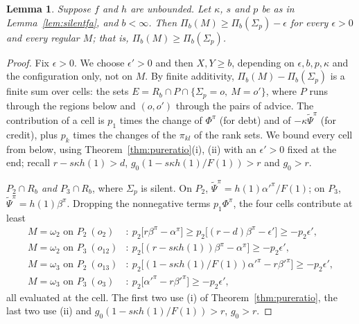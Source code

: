 \documentclass[11pt]{article}
\newtheorem{lemma}[theorem]{Lemma}
\theoremstyle{definition}\newtheorem{definition}[theorem]{Definition}
\theoremstyle{remark}\newtheorem{remark}[theorem]{Remark}
\newcommand{\Psitil}{\widetilde\Psi}
\begin{document}
\begin{lemma}\label{lem:pureopt}
Suppose $f$ and $h$ are unbounded. Let $\kappa$, $s$ and $p$ be as in
Lemma~\ref{lem:silentfa}, and $b<\infty$. Then
$\Pi_b(M)\ge\Pi_b(\Sigma_p)-\epsilon$ for every $\epsilon>0$ and every
regular $M$; that is, $\Pi_b(M)\ge\Pi_b(\Sigma_p)$.
\end{lemma}
\begin{proof}
Fix $\epsilon>0$. We choose $\epsilon'>0$ and then $X,Y\ge b$, depending
on $\epsilon,b,p,\kappa$ and the configuration only, not on $M$.
By finite additivity, $\Pi_b(M)-\Pi_b(\Sigma_p)$ is a finite sum over cells:
the sets $E=R_b\cap P\cap\{\Sigma_p=o,\ M=o'\}$, where $P$ runs through the
regions below and $(o,o')$ through the pairs of advice. The contribution of
a cell is $p_1$ times the change of $\Phi^\pi$ (for debt) and of
$-\kappa\Psitil^\pi$ (for credit), plus $p_k$ times the changes of the
$\pi_{kl}$ of the rank sets. We bound every cell from below, using
Theorem~\ref{thm:pureratio}(i), (ii) with an $\epsilon'>0$ fixed at the end;
recall $r-s\kappa h(1)>d$, $g_0(1-s\kappa h(1)/F(1))>r$ and $g_0>r$.

\emph{$P_2\cap R_b$ and $P_3\cap R_b$}, where $\Sigma_p$ is silent. On $P_2$,
$\Psitil^\pi=h(1)\alpha'^\pi/F(1)$; on $P_3$, $\Psitil^\pi=h(1)\beta^\pi$.
Dropping the nonnegative terms $p_1\Phi^\pi$, the four cells contribute at
least
\begin{align*}
 M=\omega_2\text{ on }P_2\ (o_2)&:\ p_2\bigl[r\beta^\pi-\alpha^\pi\bigr]
 \ge p_2\bigl[(r-d)\beta^\pi-\epsilon'\bigr]\ge-p_2\epsilon',\\
 M=\omega_2\text{ on }P_3\ (o_{12})&:\ p_2\bigl[(r-s\kappa h(1))\beta^\pi-
 \alpha^\pi\bigr]\ge-p_2\epsilon',\\
 M=\omega_3\text{ on }P_2\ (o_{13})&:\ p_2\bigl[(1-s\kappa h(1)/F(1))
 \alpha'^\pi-r\beta'^\pi\bigr]\ge-p_2\epsilon',\\
 M=\omega_3\text{ on }P_3\ (o_3)&:\ p_2\bigl[\alpha'^\pi-r\beta'^\pi\bigr]
 \ge-p_2\epsilon',
\end{align*}
all evaluated at the cell. The first two use (i) of
Theorem~\ref{thm:pureratio}, the last two use (ii) and
$g_0(1-s\kappa h(1)/F(1))>r$, $g_0>r$.


\end{proof}
\end{document}
